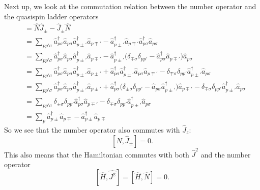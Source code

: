 \documentclass[a4paper, 11pt, notitlepage, english]{article}
\newcommand{\op}[1]{\hat{#1}}
\begin{document}
Next up, we look at the commutation relation between the number operator and the quasispin ladder operators
\begin{align*}
[\op{N},\op{J}_\pm] &= \op{N}\op{J}_\pm - \op{J}_\pm\op{N} \\
&= \sum_{pp'\sigma} \op{a}_{p\sigma}^\dagger\op{a}_{p\sigma} \op{a}_{p\pm'}^\dagger \op{a}_{p\mp'} - \op{a}_{p\pm'}^\dagger \op{a}_{p\mp'} \op{a}_{p\sigma}^\dagger\op{a}_{p\sigma} \\
&= \sum_{pp'\sigma} \op{a}_{p\sigma}^\dagger\op{a}_{p\sigma} \op{a}_{p\pm'}^\dagger \op{a}_{p\mp'} -  \op{a}_{p\pm'}^\dagger \big(\delta_{\mp\sigma}\delta_{pp'} - \op{a}_{p\sigma}^\dagger\op{a}_{p\mp'}\big)\op{a}_{p\sigma} \\
&= \sum_{pp'\sigma} \op{a}_{p\sigma}^\dagger\op{a}_{p\sigma} \op{a}_{p\pm'}^\dagger \op{a}_{p\pm'} +   \op{a}_{p\sigma}^\dagger\op{a}_{p\pm'}^\dagger\op{a}_{p\sigma}\op{a}_{p\mp'} -  \delta_{\mp\sigma}\delta_{pp'}\op{a}_{p\pm'}^\dagger\op{a}_{p\sigma} \\
&= \sum_{pp'\sigma} \op{a}_{p\sigma}^\dagger\op{a}_{p\sigma} \op{a}_{p\pm'}^\dagger \op{a}_{p\pm'} +   \op{a}_{p\sigma}^\dagger\big(\delta_{\pm\sigma}\delta_{pp'} - \op{a}_{p\sigma}\op{a}_{p\pm'}^\dagger\big) \op{a}_{p\mp'} -  \delta_{\mp\sigma}\delta_{pp'}\op{a}_{p\pm'}^\dagger\op{a}_{p\sigma} \\
&= \sum_{pp'\sigma} \delta_{\pm\sigma}\delta_{pp'}\op{a}_{p\sigma}^\dagger\op{a}_{p\mp'} -  \delta_{\mp\sigma}\delta_{pp'}\op{a}_{p\pm'}^\dagger\op{a}_{p\sigma} \\
&= \sum_{p} \op{a}_{p\pm}^\dagger\op{a}_{p\mp} -  \op{a}_{p\pm}^\dagger\op{a}_{p\mp}
\end{align*}
So we see that the number operator also commutes with $\op{J}_z$:
$$[\op{N}, \op{J}_\pm] = 0.$$
This also means that the Hamiltonian commutes with both $\op{J}^2$ and the number operator
$$[\op{H}, \op{J^2}] = [\op{H}, \op{N}] = 0.$$

\clearpage
\end{document}
